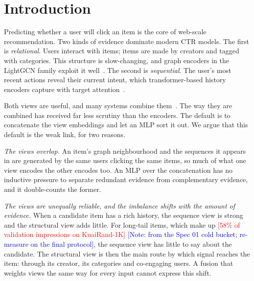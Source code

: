 \documentclass[sigconf,anonymous,review]{acmart}
\newif\ifshownotes \shownotestrue
\newcommand{\tbd}[1]{\textcolor{red}{[#1]}}
\newcommand{\note}[1]{\ifshownotes\textcolor{blue}{[Note: #1]}\fi}
\begin{document}
\maketitle

\section{Introduction}

Predicting whether a user will click an item is the core of web-scale
recommendation. Two kinds of evidence dominate modern CTR models. The first is
\emph{relational}. Users interact with items; items are made by creators and
tagged with categories. This structure is slow-changing, and graph encoders in
the LightGCN family exploit it well~\cite{he2020lightgcn,yu2022simgcl}. The
second is \emph{sequential}. The user's most recent actions reveal their
current intent, which transformer-based history encoders capture with target
attention~\cite{zhou2018din,chen2019bst,xia2023transact,zhai2024hstu}.

Both views are useful, and many systems combine them~\cite{chang2021surge,wang2020gcegnn,zhang2022gcl4sr}.
The way they are combined has received far less scrutiny than the encoders.
The default is to concatenate the view embeddings and let an MLP sort it out.
We argue that this default is the weak link, for two reasons.

\emph{The views overlap.} An item's graph neighbourhood and the sequences it
appears in are generated by the same users clicking the same items, so much
of what one view encodes the other encodes too. An MLP over the concatenation
has no inductive pressure to separate redundant evidence from complementary
evidence, and it double-counts the former.

\emph{The views are unequally reliable, and the imbalance shifts with the
amount of evidence.} When a candidate item has a rich history, the sequence
view is strong and the structural view adds little. For long-tail items,
which make up \tbd{58\% of validation impressions on KuaiRand-1K}
\note{from the Spec 01 cold bucket; re-measure on the final protocol}, the
sequence view has little to say about the candidate. The structural view is
then the main route by which signal reaches the item: through its creator,
its categories and co-engaging users. A fusion that weights views the same
way for every input cannot express this shift.
\end{document}
